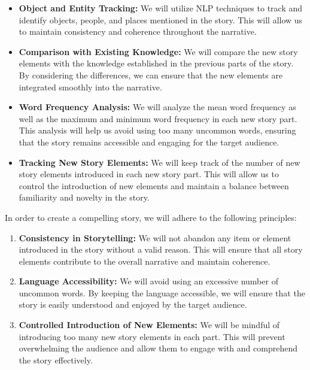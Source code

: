 \documentclass[submit,techrep,english]{ipsj}
\begin{document}
\begin{itemize}
    \item \textbf{Object and Entity Tracking:}
          We will utilize NLP techniques to track and identify objects, people, and places mentioned in the story. This will allow us to maintain consistency and coherence throughout the narrative.

    \item \textbf{Comparison with Existing Knowledge:}
          We will compare the new story elements with the knowledge established in the previous parts of the story. By considering the differences, we can ensure that the new elements are integrated smoothly into the narrative.

    \item \textbf{Word Frequency Analysis:}
          We will analyze the mean word frequency as well as the maximum and minimum word frequency in each new story part. This analysis will help us avoid using too many uncommon words, ensuring that the story remains accessible and engaging for the target audience.

    \item \textbf{Tracking New Story Elements:}
          We will keep track of the number of new story elements introduced in each new story part. This will allow us to control the introduction of new elements and maintain a balance between familiarity and novelty in the story.
\end{itemize}

In order to create a compelling story, we will adhere to the following principles:

\begin{enumerate}
    \item \textbf{Consistency in Storytelling:} We will not abandon any item or element introduced in the story without a valid reason. This will ensure that all story elements contribute to the overall narrative and maintain coherence.
    \item \textbf{Language Accessibility:} We will avoid using an excessive number of uncommon words. By keeping the language accessible, we will ensure that the story is easily understood and enjoyed by the target audience.
    \item \textbf{Controlled Introduction of New Elements:} We will be mindful of introducing too many new story elements in each part. This will prevent overwhelming the audience and allow them to engage with and comprehend the story effectively.
\end{enumerate}
\end{document}
